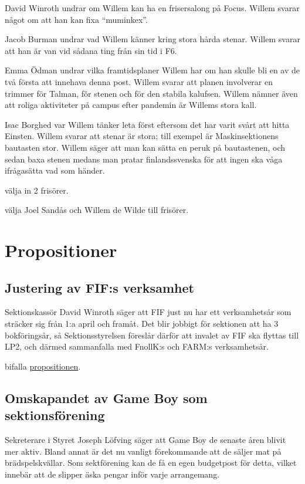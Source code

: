 \documentclass[hidelinks]{sektionsmote}
\begin{document}
David Winroth undrar om Willem kan ha en frisersalong på Focus.
Willem svarar något om att han kan fixa \enquote{muminkex}.

Jacob Burman undrar vad Willem känner kring stora hårda stenar.
Willem svarar att han är van vid sådana ting från sin tid i F6.

Emma Ödman undrar vilka framtidsplaner Willem har om han skulle bli en av de två första att innehava denna post.
Willem svarar att planen involverar en trimmer för Talman, för stenen och för den stabila kalufsen.
Willem nämner även att roliga aktiviteter på campus efter pandemin är Willems stora kall.

Isac Borghed var Willem tänker leta först eftersom det har varit svårt att hitta Einsten.
Willem svarar att stenar är stora; till exempel är Maskinsektionens bautasten stor.
Willem säger att man kan sätta en peruk på bautastenen, och sedan baxa stenen medans man pratar finlandssvenska för att ingen ska våga ifrågasätta vad som händer.

\begin{beslut}
  \item välja in 2 frisörer.
  \item välja Joel Sandås och Willem de Wilde till frisörer.
\end{beslut}


\section{Propositioner}
\subsection{Justering av FIF:s verksamhet}
Sektionskassör David Winroth säger att FIF just nu har ett verksamhetsår som sträcker sig från 1:a april och framåt.
Det blir jobbigt för sektionen att ha 3 bokföringsår, så Sektionsstyrelsen föreslår därför att invalet av FIF ska flyttas till LP2, och därmed sammanfalla med FnollK:s och FARM:s verksamhetsår.

\begin{beslut}
  \item bifalla \hyperlink{bilagor/prop/a.pdf.1}{propositionen}.
\end{beslut}


\subsection{Omskapandet av Game Boy som sektionsförening}
Sekreterare i Styret Joseph Löfving säger att Game Boy de senaste åren blivit mer aktiv.
Bland annat är det nu vanligt förekommande att de säljer mat på brädspelskvällar.
Som sektförening kan de få en egen budgetpost för detta, vilket innebär att de slipper äska pengar inför varje arrangemang.
\end{document}
